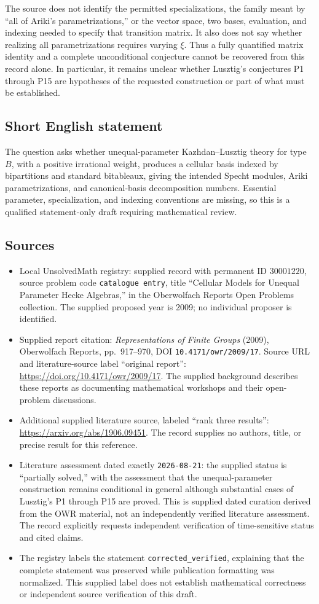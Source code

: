 \documentclass[11pt]{article}
\begin{document}
The source does not identify the permitted specializations, the family meant by ``all of Ariki's parametrizations,'' or the vector space, two bases, evaluation, and indexing needed to specify that transition matrix. It also does not say whether realizing all parametrizations requires varying \(\xi\). Thus a fully quantified matrix identity and a complete unconditional conjecture cannot be recovered from this record alone. In particular, it remains unclear whether Lusztig's conjectures P1 through P15 are hypotheses of the requested construction or part of what must be established.
\subsection{Short English statement}
The question asks whether unequal-parameter Kazhdan--Lusztig theory for type \(B\), with a positive irrational weight, produces a cellular basis indexed by bipartitions and standard bitableaux, giving the intended Specht modules, Ariki parametrizations, and canonical-basis decomposition numbers. Essential parameter, specialization, and indexing conventions are missing, so this is a qualified statement-only draft requiring mathematical review.
\subsection{Sources}
\begin{itemize}
\item Local UnsolvedMath registry: supplied record with permanent ID \(30001220\), source problem code \texttt{catalogue entry}, title ``Cellular Models for Unequal Parameter Hecke Algebras,'' in the Oberwolfach Reports Open Problems collection. The supplied proposed year is 2009; no individual proposer is identified.
\item Supplied report citation: \emph{Representations of Finite Groups} (2009), Oberwolfach Reports, pp.\ 917--970, DOI \texttt{10.4171/owr/2009/17}. Source URL and literature-source label ``original report'': \url{https://doi.org/10.4171/owr/2009/17}. The supplied background describes these reports as documenting mathematical workshops and their open-problem discussions.
\item Additional supplied literature source, labeled ``rank three results'': \url{https://arxiv.org/abs/1906.09451}. The record supplies no authors, title, or precise result for this reference.
\item Literature assessment dated exactly \texttt{2026-08-21}: the supplied status is ``partially solved,'' with the assessment that the unequal-parameter construction remains conditional in general although substantial cases of Lusztig's P1 through P15 are proved. This is supplied dated curation derived from the OWR material, not an independently verified literature assessment. The record explicitly requests independent verification of time-sensitive status and cited claims.
\item The registry labels the statement \texttt{corrected\_verified}, explaining that the complete statement was preserved while publication formatting was normalized. This supplied label does not establish mathematical correctness or independent source verification of this draft.
\end{itemize}
\end{document}
